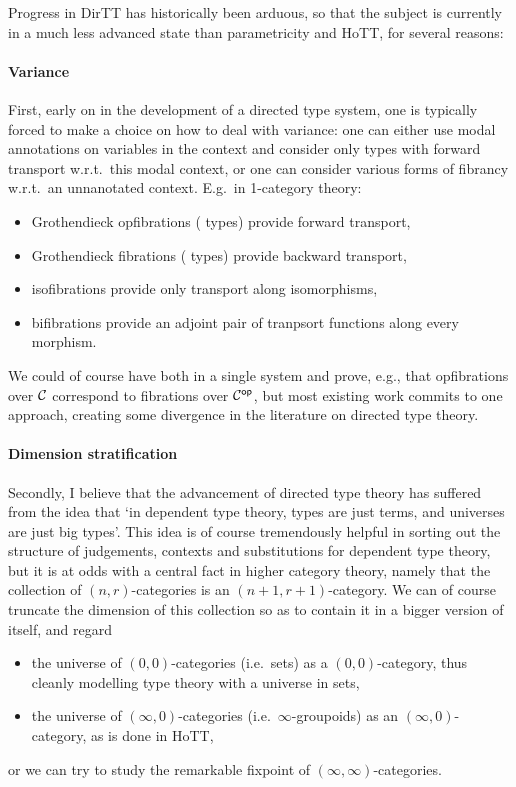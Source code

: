 \documentclass{lmcs} %
\theoremstyle{plain}\newtheorem{satz}[thm]{Satz} %
\theoremstyle{plain}
\theoremstyle{definition}
\begin{document}
Progress in DirTT has historically been arduous, so that the subject is currently in a much less advanced state than parametricity and HoTT, for several reasons:

\paragraph{Variance}
First, early on in the development of a directed type system, one is typically forced to make a choice on how to deal with variance: one can either use modal annotations on variables in the context and consider only \covarfib{} types with forward transport w.r.t.\ this modal context, or one can consider various forms of fibrancy w.r.t.\ an unnanotated context.
E.g.\ in 1-category theory:
\begin{itemize}
	\item Grothendieck opfibrations (\covarfib{} types) provide forward transport,
	\item Grothendieck fibrations (\contravarfib{} types) provide backward transport,
	\item isofibrations provide only transport along isomorphisms,
	\item bifibrations provide an adjoint pair of tranpsort functions along every morphism.
\end{itemize}
We could of course have both in a single system and prove, e.g., that opfibrations over ${\mathcal{C}}$ correspond to fibrations over ${\mathcal{C}}^{\mathsf{op}}$,
but most existing work commits to one approach, creating some divergence in the literature on directed type theory.

\paragraph{Dimension stratification}
Secondly, I believe that the advancement of directed type theory has suffered from the idea that `in dependent type theory, types are just terms, and universes are just big types'.
This idea is of course tremendously helpful in sorting out the structure of judgements, contexts and substitutions for dependent type theory, but it is at odds with a central fact in higher category theory, namely that the collection of $(n, r)$-categories is an $(n+1, r+1)$-category.
We can of course truncate the dimension of this collection so as to contain it in a bigger version of itself, and regard
\begin{itemize}
	\item the universe of $(0, 0)$-categories (i.e.\ sets) as a $(0, 0)$-category, thus cleanly modelling type theory with a universe in sets,
	\item the universe of $(\infty, 0)$-categories (i.e.\ $\infty$-groupoids) as an $(\infty, 0)$-category, as is done in HoTT,
\end{itemize}
or we can try to study the remarkable fixpoint of $(\infty,\infty)$-categories.
\end{document}
